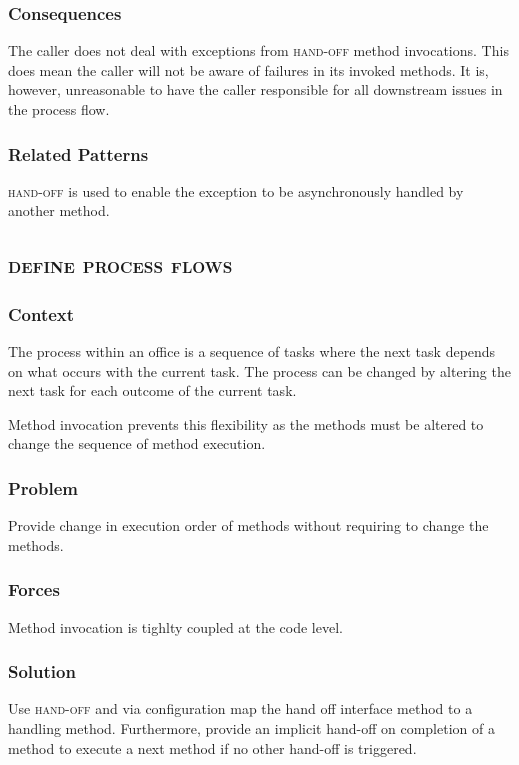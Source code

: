 \documentclass[prodmode]{style/acmlarge}
\begin{document}
\subsubsection*{Consequences} The caller does not deal with exceptions from
\textsc{hand-off} method invocations.  This does mean the caller will not be
aware of failures in its invoked methods.  It is, however, unreasonable to have
the caller responsible for all downstream issues in the process flow.

\subsubsection*{Related Patterns} \textsc{hand-off} is used to enable the
exception to be asynchronously handled by another method.



\subsection{\textsc{\textbf{define process flows}}}

\subsubsection*{Context} The process within an office is a sequence of tasks
where the next task depends on what occurs with the current task.  The process
can be changed by altering the next task for each outcome of the current task.

Method invocation prevents this flexibility as the methods must be altered to
change the sequence of method execution.

\subsubsection*{Problem} Provide change in execution order of methods without
requiring to change the methods.

\subsubsection*{Forces} Method invocation is tighlty coupled at the code level.

\subsubsection*{Solution} Use \textsc{hand-off} and via configuration map the
hand off interface method to a handling method.  Furthermore, provide an
implicit hand-off on completion of a method to execute a next method if no other
hand-off is triggered.
\end{document}
